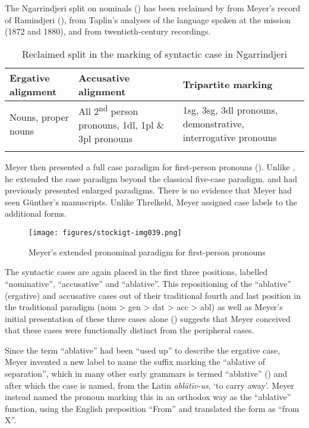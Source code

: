 The Ngarrindjeri split on nominals () has been reclaimed by \citet{bannister_longitudinal_2004} from Meyer’s record of Ramindjeri (\citeyear{meyer_vocabulary_1843}), from Taplin’s analyses of the language spoken at the mission (1872 and 1880), and from twentieth-century recordings.

\begin{table}
	\begin{tabularx}{\textwidth}{QQQ}
		\lsptoprule
		Ergative alignment  & Accusative alignment  & Tripartite marking  \\
		\midrule
		Nouns, \newline proper nouns & All 2\textsuperscript{nd} person pronouns, 1dl, 1pl \& 3pl pronouns & 1sg, 3sg, 3dl pronouns, demonstrative, interrogative pronouns \\
		\lspbottomrule
	\end{tabularx}
	\caption{Reclaimed split in the marking of syntactic case in Ngarrindjeri}
	\label{tab:key:97}
\end{table}

Meyer then presented a full case paradigm for first-person pronouns (). Unlike \citet{TeichelmannSchürmann1840}, he extended the case paradigm beyond the classical five-case paradigm. \citet{Threlkeld1834} and \citet{Günther1838} had previously presented enlarged paradigms. There is no evidence that Meyer had seen Günther’s manuscripts. Unlike Threlkeld, Meyer assigned case labels to the additional forms.


\begin{figure}
	\texttt{[image: figures/stockigt-img039.png]}
	\caption{Meyer’s extended pronominal paradigm for first-person pronouns \citeyearpar[24]{meyer_vocabulary_1843}}
	\label{fig:key:98}
\end{figure}

The syntactic cases are again placed in the first three positions, labelled ``nominative'', “accusative” and ``ablative''. This repositioning of the “ablative” (ergative) and accusative cases out of their traditional fourth and last position in the traditional paradigm (nom > gen > dat > acc > abl) as well as Meyer’s initial presentation of these three cases alone () suggests that Meyer conceived that these cases were functionally distinct from the peripheral cases.

Since the term “ablative” had been “used up” to describe the ergative case, Meyer invented a new label to name the suffix marking the ``ablative of separation'', which in many other early grammars is termed “ablative” () and after which the case is named, from the Latin \textit{ablātīv-us}, `to carry away'. Meyer instead named the pronoun marking this in an orthodox way as the “ablative” function, using the English preposition ``From'' and translated the form as ``from X''.

